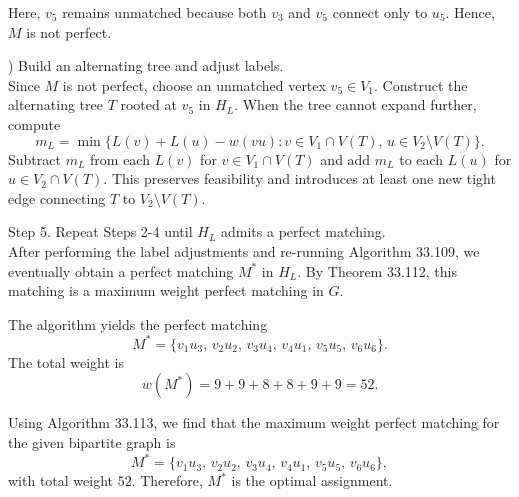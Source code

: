 \documentclass[a4paper,11pt]{report}
\begin{document}
Here, \( v_5 \) remains unmatched because both \( v_3 \) and \( v_5 \) connect only to \( u_5 \). Hence, \( M \) is not perfect.

) Build an alternating tree and adjust labels.\\
Since \( M \) is not perfect, choose an unmatched vertex \( v_5 \in V_1 \). Construct the alternating tree \( T \) rooted at \( v_5 \) in \( H_L \). When the tree cannot expand further, compute
\[
  m_L = \min\{ L(v) + L(u) - w(vu) : v \in V_1 \cap V(T),\, u \in V_2 \setminus V(T) \}.
\]
Subtract \( m_L \) from each \( L(v) \) for \( v \in V_1 \cap V(T) \) and add \( m_L \) to each \( L(u) \) for \( u \in V_2 \cap V(T) \).
This preserves feasibility and introduces at least one new tight edge connecting \( T \) to \( V_2 \setminus V(T) \).

\bigskip
Step 5. Repeat Steps 2-4 until \( H_L \) admits a perfect matching.\\
After performing the label adjustments and re-running Algorithm 33.109, we eventually obtain a perfect matching \( M^* \) in \( H_L \). By Theorem 33.112, this matching is a maximum weight perfect matching in \( G \).

\bigskip
The algorithm yields the perfect matching
\[
M^* = \{ v_1u_3,\, v_2u_2,\, v_3u_4,\, v_4u_1,\, v_5u_5,\, v_6u_6 \}.
\]
The total weight is
\[
w(M^*) = 9 + 9 + 8 + 8 + 9 + 9 = 52.
\]

\noindent
Using Algorithm 33.113, we find that the maximum weight perfect matching for the given bipartite graph is
\[
M^* = \{ v_1u_3,\, v_2u_2,\, v_3u_4,\, v_4u_1,\, v_5u_5,\, v_6u_6 \},
\]
with total weight \( 52 \). Therefore, \( M^* \) is the optimal assignment.
\end{document}
